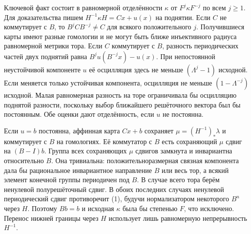 \documentclass[11pt,a4paper]{article}
\begin{document}
Ключевой факт состоит в равномерной отделённости $\kappa$ от $F^j\kappa F^{-j}$ по всем $j\ge1$. Для доказательства пишем $H^{-1}\kappa H=Cx+u(x)$ на поднятии. Если $C$ не коммутирует с $B$, то $B^j C B^{-j}\ne C$ для всякого положительного $j$. Получившиеся карты имеют разные гомологии и не могут быть ближе инъективного радиуса равномерной метрики тора. Если $C$ коммутирует с $B$, разность периодических частей двух поднятий равна $B^j u(B^{-j}x)-u(x)$. При непостоянной неустойчивой компоненте $u$ её осцилляция здесь не меньше $(\Lambda^j-1)$ исходной. Если меняется только устойчивая компонента, осцилляция не меньше $(1-\Lambda^{-j})$ исходной. Малая равномерная разность на торе ограничивала бы осцилляцию поднятой разности, поскольку выбор ближайшего решёточного вектора был бы постоянным. Обе оценки дают отделённость, если $u$ не постоянна.

Если $u=b$ постоянна, аффинная карта $Cx+b$ сохраняет $\mu=(H^{-1})_*\lambda$ и коммутирует с $B$ на гомологиях. Её коммутатор с $B$ есть сохраняющий $\mu$ сдвиг на $(B-I)b$. Группа всех сохраняющих $\mu$ сдвигов замкнута и инвариантна относительно $B$. Она тривиальна: положительноразмерная связная компонента дала бы рациональное инвариантное направление $B$ или весь тор, а всякий элемент конечной группы периодичен под $B$. В случае всего тора берём ненулевой полурешёточный сдвиг. В обоих последних случаях ненулевой периодический сдвиг противоречит (1), будучи нормализатором некоторого $B^n$ через $H$. Поэтому $Bb=b$ и исходная $\kappa$ была бы степенью $F$, что исключено. Перенос нижней границы через $H$ использует лишь равномерную непрерывность $H^{-1}$.
\end{document}
